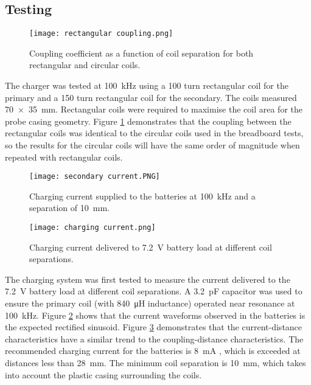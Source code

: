 \subsection{Testing}
\begin{figure}[htbp]
	\centering
	\texttt{[image: rectangular coupling.png]}
	\caption{Coupling coefficient as a function of coil separation for both rectangular and circular coils.}
	\label{fig: rectangular coupling}
\end{figure}


The charger was tested at \SI{100}{\kilo\hertz} using a 100 turn rectangular coil for the primary and a 150 turn rectangular coil for the secondary. The coils measured \SI{70 x 35}{\milli\metre}. Rectangular coils were required to maximise the coil area for the probe casing geometry. Figure \ref{fig: rectangular coupling} demonstrates that the coupling between the rectangular coils was identical to the circular coils used in the breadboard tests, so the results for the circular coils will have the same order of magnitude when repeated with rectangular coils.\\


\begin{figure}[htbp]
	\centering
	\texttt{[image: secondary current.PNG]}
	\caption{Charging current supplied to the batteries at \SI{100}{\kilo\hertz} and a separation of \SI{10}{\milli\metre}.}
	\label{fig: secondary current}
\end{figure}



\begin{figure}[htbp]
	\centering
	\texttt{[image: charging current.png]}
	\caption{Charging current delivered to \SI{7.2}{\volt} battery load at different coil separations.}
	\label{fig: current distance}
\end{figure}

The charging system was first tested to measure the current delivered to the \SI{7.2}{\volt} battery load at different coil separations. A \SI{3.2}{\pico\farad} capacitor was used to ensure the primary coil (with \SI{840}{\micro\henry} inductance) operated near resonance at \SI{100}{\kilo\hertz}. Figure \ref{fig: secondary current} shows that the current waveforms observed in the batteries is the expected rectified sinusoid. Figure \ref{fig: current distance} demonstrates that the current-distance characteristics have a similar trend to the coupling-distance characteristics. The recommended charging current for the batteries is \SI{8}{\milli\ampere} \cite{rs_pro_batteries}, which is exceeded at distances less than \SI{28}{\milli\metre}. The minimum coil separation is \SI{10}{\milli\metre}, which takes into account the plastic casing surrounding the coils.\\

